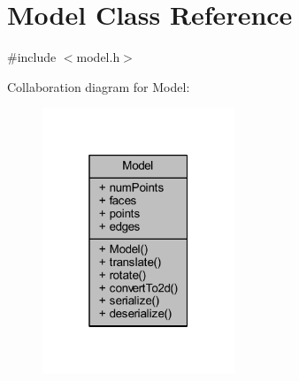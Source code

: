 \hypertarget{class_model}{}\section{Model Class Reference}
\label{class_model}


{\ttfamily \#include $<$model.\+h$>$}



Collaboration diagram for Model\+:\nopagebreak
\begin{figure}[H]
\begin{center}
\leavevmode
\includegraphics[width=163pt]{class_model__coll__graph}
\end{center}
\end{figure}
